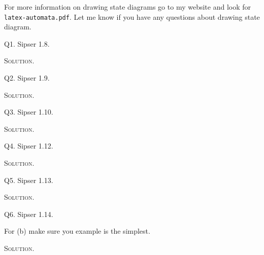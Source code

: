 For more information on drawing state diagrams go to my website
and look for \verb!latex-automata.pdf!.
Let me know if you have any questions about drawing state diagram.

\newpage
Q1. Sipser 1.8.

\textsc{Solution}.



\newpage
Q2. Sipser 1.9.

\textsc{Solution}.



\newpage
Q3. Sipser 1.10.

\textsc{Solution}.



\newpage
Q4. Sipser 1.12.

\textsc{Solution}.



Q5. Sipser 1.13.

\textsc{Solution}.




\newpage
Q6. Sipser 1.14.

For (b) make sure you example is the simplest.

\textsc{Solution}.




